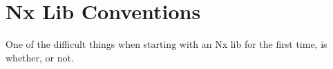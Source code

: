 \maketitle{}
\section{ Nx Lib Conventions }

One of the difficult things when starting with an Nx lib for the first time, is
whether, or not. 
